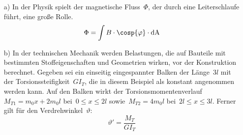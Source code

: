 \begin{itemize}
	\item[a)] In der Physik spielt der magnetische Fluss~$\Phi$, der durch eine Leiterschlaufe führt, eine große Rolle.
	\begin{equation*}
		\Phi = \int B \cdot \cosp{\varphi}\cdot \mathrm{dA}
	\end{equation*}
	
	\item[b)] In der technischen Mechanik werden Belastungen, die auf Bauteile mit bestimmten Stoffeigenschaften und Geometrien wirken, vor der Konstruktion berechnet. Gegeben sei ein einseitig eingespannter Balken der Länge~$3l$ mit der Torsionssteifigkeit~$GI_T$, die in diesem Beispiel als konstant angenommen werden kann. Auf den Balken wirkt der Torsionsmomentenverlauf~$M_{T1}=m_0x+2m_0 l$ bei~$0\leq x \leq 2l$ sowie~$M_{T2}=4m_0 l$ bei~$2l \leq x \leq 3l$. Ferner gilt für den Verdrehwinkel~$\vartheta$:
	\begin{equation*}
		\vartheta ' = \frac{M_T}{GI_T}
	\end{equation*}
\end{itemize}
